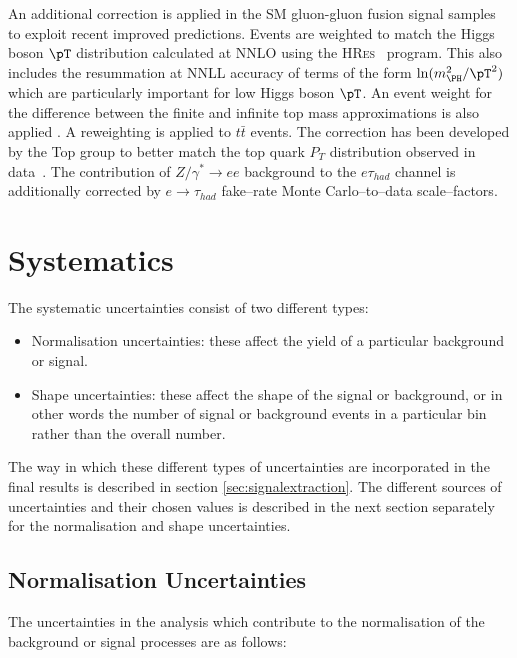 An additional correction is applied in the \ac{SM} gluon-gluon fusion signal
samples to exploit recent improved predictions. Events are weighted to match the
Higgs boson $\pT$ distribution calculated at \ac{NNLO} using the
\textsc{HRes}~\cite{deFlorian:2012mx} program. This also includes the
resummation at \ac{NNLL} accuracy of terms of the form
$\ln(m_{\PH}^{2}/\pT^{2})$ which are particularly important for low Higgs boson
$\pT$. An event weight for the difference between the finite and infinite top
mass approximations is also applied \cite{Grazzini:2013mca}.
A reweighting is applied to $t \bar{t}$ events. The correction has been developed by the Top
group to better match the top quark $P_{T}$ distribution observed in data~\cite{TopPtReweighting}. 
The contribution of $Z/\gamma^{*} \to ee$ background to the $e\tau_{had}$ channel
is additionally corrected by $e \to \tau_{had}$ fake--rate Monte Carlo--to--data
scale--factors.

\section{Systematics}
\label{sec:systematics}

The systematic uncertainties consist of two different types:

\begin{itemize} 
\item Normalisation uncertainties: these affect the yield of a particular background or
signal.
\item Shape uncertainties: these affect the shape of the signal or background, or in
other words the number of signal or background events in a particular bin rather
than the overall number.
\end{itemize}

The way in which these different types of uncertainties are incorporated in the
final results is described in section \ref{sec:signalextraction}. The different
sources of uncertainties and their chosen values is described in the next
section separately for the normalisation and shape uncertainties.

\subsection{Normalisation Uncertainties}
\label{sec:systematicUncertainties_yield}

The uncertainties in the analysis which contribute to the normalisation of the
background or signal processes are as follows:

